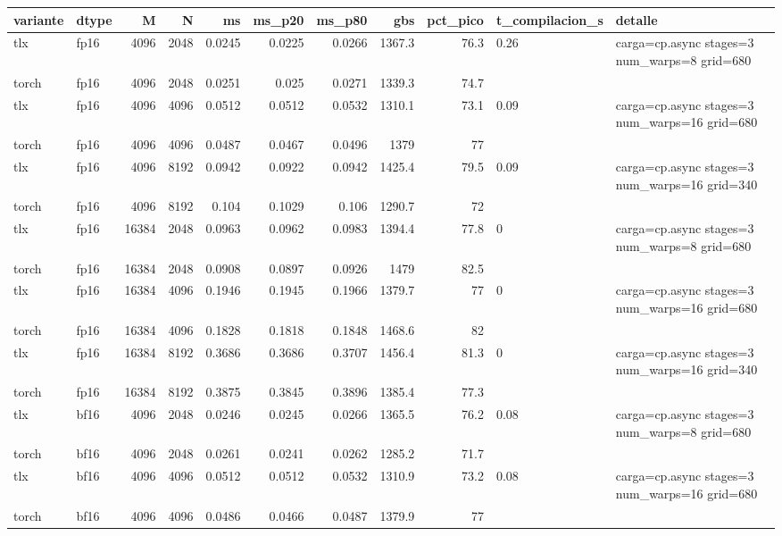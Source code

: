 \begin{table}[htbp]
  \centering\small
  \begin{tabular}{llrrrrrrrll}
    \toprule
    variante & dtype & M & N & ms & ms\_p20 & ms\_p80 & gbs & pct\_pico & t\_compilacion\_s & detalle \\
    \midrule
    tlx & fp16 & 4096 & 2048 & 0.0245 & 0.0225 & 0.0266 & 1367.3 & 76.3 & 0.26 & carga=cp.async stages=3 num\_warps=8 grid=680 \\
    torch & fp16 & 4096 & 2048 & 0.0251 & 0.025 & 0.0271 & 1339.3 & 74.7 &  &  \\
    tlx & fp16 & 4096 & 4096 & 0.0512 & 0.0512 & 0.0532 & 1310.1 & 73.1 & 0.09 & carga=cp.async stages=3 num\_warps=16 grid=680 \\
    torch & fp16 & 4096 & 4096 & 0.0487 & 0.0467 & 0.0496 & 1379 & 77 &  &  \\
    tlx & fp16 & 4096 & 8192 & 0.0942 & 0.0922 & 0.0942 & 1425.4 & 79.5 & 0.09 & carga=cp.async stages=3 num\_warps=16 grid=340 \\
    torch & fp16 & 4096 & 8192 & 0.104 & 0.1029 & 0.106 & 1290.7 & 72 &  &  \\
    tlx & fp16 & 16384 & 2048 & 0.0963 & 0.0962 & 0.0983 & 1394.4 & 77.8 & 0 & carga=cp.async stages=3 num\_warps=8 grid=680 \\
    torch & fp16 & 16384 & 2048 & 0.0908 & 0.0897 & 0.0926 & 1479 & 82.5 &  &  \\
    tlx & fp16 & 16384 & 4096 & 0.1946 & 0.1945 & 0.1966 & 1379.7 & 77 & 0 & carga=cp.async stages=3 num\_warps=16 grid=680 \\
    torch & fp16 & 16384 & 4096 & 0.1828 & 0.1818 & 0.1848 & 1468.6 & 82 &  &  \\
    tlx & fp16 & 16384 & 8192 & 0.3686 & 0.3686 & 0.3707 & 1456.4 & 81.3 & 0 & carga=cp.async stages=3 num\_warps=16 grid=340 \\
    torch & fp16 & 16384 & 8192 & 0.3875 & 0.3845 & 0.3896 & 1385.4 & 77.3 &  &  \\
    tlx & bf16 & 4096 & 2048 & 0.0246 & 0.0245 & 0.0266 & 1365.5 & 76.2 & 0.08 & carga=cp.async stages=3 num\_warps=8 grid=680 \\
    torch & bf16 & 4096 & 2048 & 0.0261 & 0.0241 & 0.0262 & 1285.2 & 71.7 &  &  \\
    tlx & bf16 & 4096 & 4096 & 0.0512 & 0.0512 & 0.0532 & 1310.9 & 73.2 & 0.08 & carga=cp.async stages=3 num\_warps=16 grid=680 \\
    torch & bf16 & 4096 & 4096 & 0.0486 & 0.0466 & 0.0487 & 1379.9 & 77 &  &  \\

\end{tabular}
\end{table}

